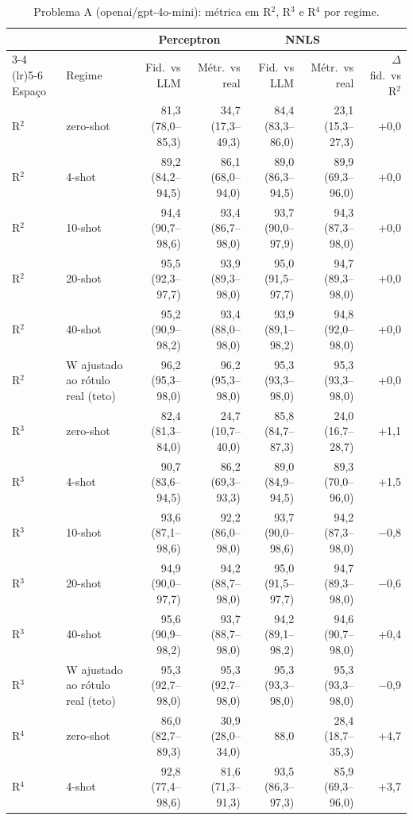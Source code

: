 \begin{table}[htbp]
\centering
\small
\caption{Problema A (openai/gpt-4o-mini): métrica em R$^2$, R$^3$ e R$^4$ por regime.}
\label{tab:bloco1_A_R2_R3_R4_zero_fewshot_gpt4mini}
\begin{tabular}{llrrrrr}
\toprule
 &  & \multicolumn{2}{c}{Perceptron} & \multicolumn{2}{c}{NNLS} &  \\ \cmidrule(lr){3-4} \cmidrule(lr){5-6}
Espaço & Regime & Fid.\ vs LLM & Métr.\ vs real & Fid.\ vs LLM & Métr.\ vs real & $\Delta$ fid.\ vs R$^2$ \\
\midrule
R$^2$ & zero-shot & 81,3 (78,0–85,3) & 34,7 (17,3–49,3) & 84,4 (83,3–86,0) & 23,1 (15,3–27,3) & +0,0 \\
R$^2$ & 4-shot & 89,2 (84,2–94,5) & 86,1 (68,0–94,0) & 89,0 (86,3–94,5) & 89,9 (69,3–96,0) & +0,0 \\
R$^2$ & 10-shot & 94,4 (90,7–98,6) & 93,4 (86,7–98,0) & 93,7 (90,0–97,9) & 94,3 (87,3–98,0) & +0,0 \\
R$^2$ & 20-shot & 95,5 (92,3–97,7) & 93,9 (89,3–98,0) & 95,0 (91,5–97,7) & 94,7 (89,3–98,0) & +0,0 \\
R$^2$ & 40-shot & 95,2 (90,9–98,2) & 93,4 (88,0–98,0) & 93,9 (89,1–98,2) & 94,8 (92,0–98,0) & +0,0 \\
R$^2$ & W ajustado ao rótulo real (teto) & 96,2 (95,3–98,0) & 96,2 (95,3–98,0) & 95,3 (93,3–98,0) & 95,3 (93,3–98,0) & +0,0 \\
\midrule
R$^3$ & zero-shot & 82,4 (81,3–84,0) & 24,7 (10,7–40,0) & 85,8 (84,7–87,3) & 24,0 (16,7–28,7) & +1,1 \\
R$^3$ & 4-shot & 90,7 (83,6–94,5) & 86,2 (69,3–93,3) & 89,0 (84,9–94,5) & 89,3 (70,0–96,0) & +1,5 \\
R$^3$ & 10-shot & 93,6 (87,1–98,6) & 92,2 (86,0–98,0) & 93,7 (90,0–98,6) & 94,2 (87,3–98,0) & $-$0,8 \\
R$^3$ & 20-shot & 94,9 (90,0–97,7) & 94,2 (88,7–98,0) & 95,0 (91,5–97,7) & 94,7 (89,3–98,0) & $-$0,6 \\
R$^3$ & 40-shot & 95,6 (90,9–98,2) & 93,7 (88,7–98,0) & 94,2 (89,1–98,2) & 94,6 (90,7–98,0) & +0,4 \\
R$^3$ & W ajustado ao rótulo real (teto) & 95,3 (92,7–98,0) & 95,3 (92,7–98,0) & 95,3 (93,3–98,0) & 95,3 (93,3–98,0) & $-$0,9 \\
\midrule
R$^4$ & zero-shot & 86,0 (82,7–89,3) & 30,9 (28,0–34,0) & 88,0 & 28,4 (18,7–35,3) & +4,7 \\
R$^4$ & 4-shot & 92,8 (77,4–98,6) & 81,6 (71,3–91,3) & 93,5 (86,3–97,3) & 85,9 (69,3–96,0) & +3,7 \\

\end{tabular}
\end{table}
